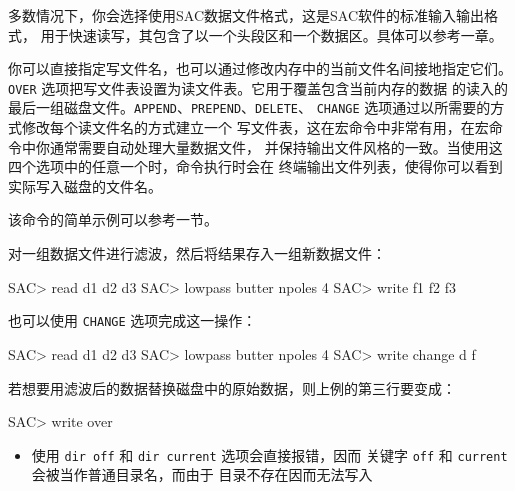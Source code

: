 多数情况下，你会选择使用SAC数据文件格式，这是SAC软件的标准输入输出格式，
用于快速读写，其包含了以一个头段区和一个数据区。具体可以参考一章。

你可以直接指定写文件名，也可以通过修改内存中的当前文件名间接地指定它们。
\texttt{OVER} 选项把写文件表设置为读文件表。它用于覆盖包含当前内存的数据
的读入的最后一组磁盘文件。\texttt{APPEND}、\texttt{PREPEND}、\texttt{DELETE}、
\texttt{CHANGE} 选项通过以所需要的方式修改每个读文件名的方式建立一个
写文件表，这在宏命令中非常有用，在宏命令中你通常需要自动处理大量数据文件，
并保持输出文件风格的一致。当使用这四个选项中的任意一个时，命令执行时会在
终端输出文件列表，使得你可以看到实际写入磁盘的文件名。

该命令的简单示例可以参考一节。

对一组数据文件进行滤波，然后将结果存入一组新数据文件：
\begin{SACCode}
SAC> read d1 d2 d3
SAC> lowpass butter npoles 4
SAC> write f1 f2 f3
\end{SACCode}

也可以使用 \texttt{CHANGE} 选项完成这一操作：
\begin{SACCode}
SAC> read d1 d2 d3
SAC> lowpass butter npoles 4
SAC> write change d f
\end{SACCode}

若想要用滤波后的数据替换磁盘中的原始数据，则上例的第三行要变成：
\begin{SACCode}
SAC> write over
\end{SACCode}

\begin{itemize}
\item 使用 \texttt{dir off} 和 \texttt{dir current} 选项会直接报错，因而
    关键字 \texttt{off} 和 \texttt{current} 会被当作普通目录名，而由于
    目录不存在因而无法写入
\end{itemize}
